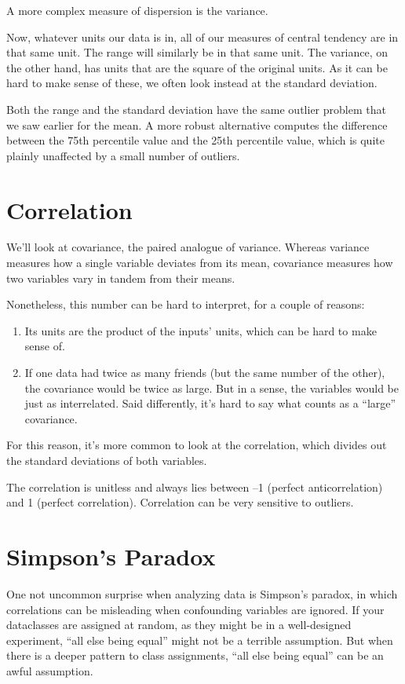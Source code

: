 A more complex measure of dispersion is the variance.

Now, whatever units our data is in, all of our measures of
central tendency are in that same unit. The range will similarly be in that
same unit. The variance, on the other hand, has units that are the square of
the original units. As it can be hard to make sense
of these, we often look instead at the standard deviation.

Both the range and the standard deviation have the same outlier problem
that we saw earlier for the mean. A more robust alternative computes the difference between the 75th
percentile value and the 25th percentile value, which is quite plainly unaffected by a small number of outliers.

\section{Correlation}
We'll look at covariance, the paired analogue of variance. Whereas
variance measures how a single variable deviates from its mean, covariance
measures how two variables vary in tandem from their means.

Nonetheless, this number can be hard to interpret, for a couple of reasons:
\begin{enumerate}
    \item Its units are the product of the inputs' units, which can be hard to make sense of.
    \item If one data had twice as many friends (but the same number of
          the other), the covariance would be twice as large. But in a sense,
          the variables would be just as interrelated. Said differently, it's hard
          to say what counts as a “large” covariance.
\end{enumerate}

For this reason, it's more common to look at the correlation, which divides
out the standard deviations of both variables.

The correlation is unitless and always lies between –1 (perfect
anticorrelation) and 1 (perfect correlation). Correlation can be very sensitive to outliers.

\section{Simpson's Paradox}
One not uncommon surprise when analyzing data is Simpson's paradox, in which correlations can be misleading when confounding variables are ignored.
 If your dataclasses are assigned at random, as
they might be in a well-designed experiment, “all else being equal” might
not be a terrible assumption. But when there is a deeper pattern to class
assignments, “all else being equal” can be an awful assumption.


